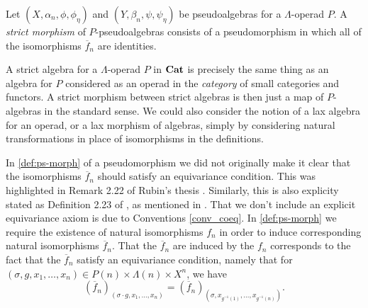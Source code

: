 \begin{Defi}\label{Defi:strictmorphism-lop}
Let $(X, \alpha_n,\phi,\phi_\eta)$ and $(Y, \beta_n,\psi,\psi_{\eta})$ be pseudoalgebras for a $\Lambda$-operad $P$. A \textit{strict morphism} of $P$-pseudoalgebras consists of a pseudomorphism in which all of the isomorphisms $\overline{f}_{n}$ are identities.
\end{Defi}

\begin{rem}
A strict algebra for a $\Lambda$-operad $P$ in $\mathbf{Cat}$ is precisely the same thing as an algebra for $P$ considered as an operad in the \textit{category} of small categories and functors. A strict morphism between strict algebras is then just a map of $P$-algebras in the standard sense. We could also consider the notion of a lax algebra for an operad, or a lax morphism of algebras, simply by considering natural transformations in place of isomorphisms in the definitions.

In \cref{def:ps-morph} of a pseudomorphism we did not originally make it clear that the isomorphisms $\overline{f}_n$ should satisfy an equivariance condition. This was highlighted in Remark 2.22 of Rubin's thesis \cite{rubin-thesis}. Similarly, this is also explicity stated as Definition 2.23 of \cite{guillou_symmetric}, as mentioned in \cite{guillou_multiplicative}. That we don't include an explicit equivariance axiom is due to Conventions \ref{conv_coeq}. In \cref{def:ps-morph} we require the existence of natural isomorphisms $f_n$ in order to induce corresponding natural isomorphisms $\overline{f}_n$. That the $\overline{f}_n$ are induced by the $f_n$ corresponds to the fact that the $\overline{f}_n$ satisfy an equivariance condition, namely that for $(\sigma, g, x_1, \ldots, x_n) \in P(n) \times \Lambda(n) \times X^n$, we have
  \[
    \left(\overline{f}_n\right)_{\left(\sigma \cdot g, x_1, \ldots, x_n\right)} = \left(\overline{f}_n\right)_{\left(\sigma,x_{g^{-1}(1)},\ldots,x_{g^{-1}(n)}\right)}.
  \]
\end{rem}

